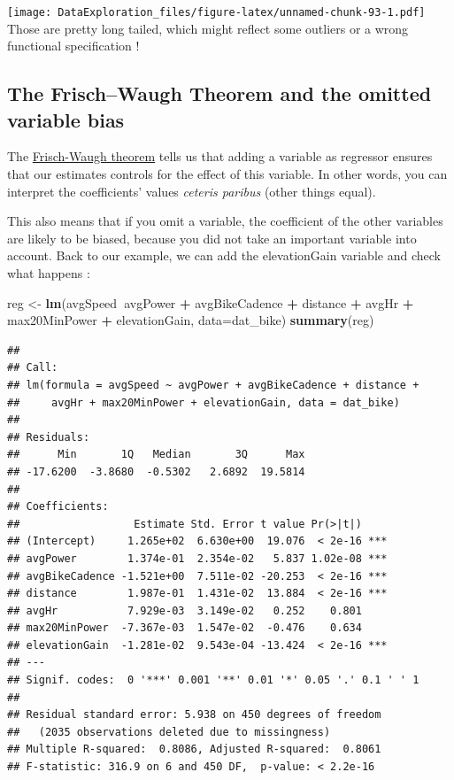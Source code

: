 \documentclass[
]{book}
\newenvironment{Shaded}{\begin{snugshade}}{\end{snugshade}}
\newcommand{\DataTypeTok}[1]{\textcolor[rgb]{0.13,0.29,0.53}{#1}}
\newcommand{\KeywordTok}[1]{\textcolor[rgb]{0.13,0.29,0.53}{\textbf{#1}}}
\newcommand{\NormalTok}[1]{#1}
\newcommand{\OperatorTok}[1]{\textcolor[rgb]{0.81,0.36,0.00}{\textbf{#1}}}
\newcommand{\StringTok}[1]{\textcolor[rgb]{0.31,0.60,0.02}{#1}}
\begin{document}
\texttt{[image: DataExploration\_files/figure-latex/unnamed-chunk-93-1.pdf]}
Those are pretty long tailed, which might reflect some outliers or a wrong functional specification !

\hypertarget{the-frischwaugh-theorem-and-the-omitted-variable-bias}{%
\subsection{The Frisch--Waugh Theorem and the omitted variable bias}\label{the-frischwaugh-theorem-and-the-omitted-variable-bias}}

The \href{https://en.wikipedia.org/wiki/Frisch\%E2\%80\%93Waugh\%E2\%80\%93Lovell_theorem}{Frisch-Waugh theorem} tells us that adding a variable as regressor ensures that our estimates controls for the effect of this variable. In other words, you can interpret the coefficients' values \emph{ceteris paribus} (other things equal).

This also means that if you omit a variable, the coefficient of the other variables are likely to be biased, because you did not take an important variable into account. Back to our example, we can add the elevationGain variable and check what happens :

\begin{Shaded}
\begin{Highlighting}[]
\NormalTok{reg <-}\StringTok{ }\KeywordTok{lm}\NormalTok{(avgSpeed}\OperatorTok{~}\NormalTok{avgPower }\OperatorTok{+}\StringTok{ }\NormalTok{avgBikeCadence }\OperatorTok{+}\StringTok{ }\NormalTok{distance }\OperatorTok{+}\StringTok{ }\NormalTok{avgHr }\OperatorTok{+}\StringTok{ }\NormalTok{max20MinPower }\OperatorTok{+}\StringTok{ }\NormalTok{elevationGain, }\DataTypeTok{data=}\NormalTok{dat_bike)}
\KeywordTok{summary}\NormalTok{(reg)}
\end{Highlighting}
\end{Shaded}

\begin{verbatim}
## 
## Call:
## lm(formula = avgSpeed ~ avgPower + avgBikeCadence + distance + 
##     avgHr + max20MinPower + elevationGain, data = dat_bike)
## 
## Residuals:
##      Min       1Q   Median       3Q      Max 
## -17.6200  -3.8680  -0.5302   2.6892  19.5814 
## 
## Coefficients:
##                  Estimate Std. Error t value Pr(>|t|)    
## (Intercept)     1.265e+02  6.630e+00  19.076  < 2e-16 ***
## avgPower        1.374e-01  2.354e-02   5.837 1.02e-08 ***
## avgBikeCadence -1.521e+00  7.511e-02 -20.253  < 2e-16 ***
## distance        1.987e-01  1.431e-02  13.884  < 2e-16 ***
## avgHr           7.929e-03  3.149e-02   0.252    0.801    
## max20MinPower  -7.367e-03  1.547e-02  -0.476    0.634    
## elevationGain  -1.281e-02  9.543e-04 -13.424  < 2e-16 ***
## ---
## Signif. codes:  0 '***' 0.001 '**' 0.01 '*' 0.05 '.' 0.1 ' ' 1
## 
## Residual standard error: 5.938 on 450 degrees of freedom
##   (2035 observations deleted due to missingness)
## Multiple R-squared:  0.8086,	Adjusted R-squared:  0.8061 
## F-statistic: 316.9 on 6 and 450 DF,  p-value: < 2.2e-16
\end{verbatim}
\end{document}
